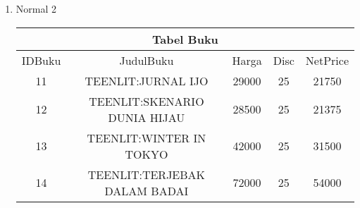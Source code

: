 \documentclass[12pt,a4paper]{article}
\begin{document}
\begin{enumerate}
\begin{enumerate}
          \item Normal 2

            \begin{adjustbox}{scale=0.6,center}
              \begin{tabular}{ |c|c|c|c|c| } 
                \hline \multicolumn{5}{|c|}{Tabel Buku} \\ \hline \hline
                IDBuku & JudulBuku                    & Harga & Disc & NetPrice \\ \hline
                11     & TEENLIT:JURNAL IJO           & 29000 & 25   & 21750    \\ \hline
                12     & TEENLIT:SKENARIO DUNIA HIJAU & 28500 & 25   & 21375    \\ \hline
                13     & TEENLIT:WINTER IN TOKYO      & 42000 & 25   & 31500    \\ \hline
                14     & TEENLIT:TERJEBAK DALAM BADAI & 72000 & 25   & 54000    \\ \hline
              \end{tabular}
            \end{adjustbox}


\end{enumerate}
\end{enumerate}
\end{document}
